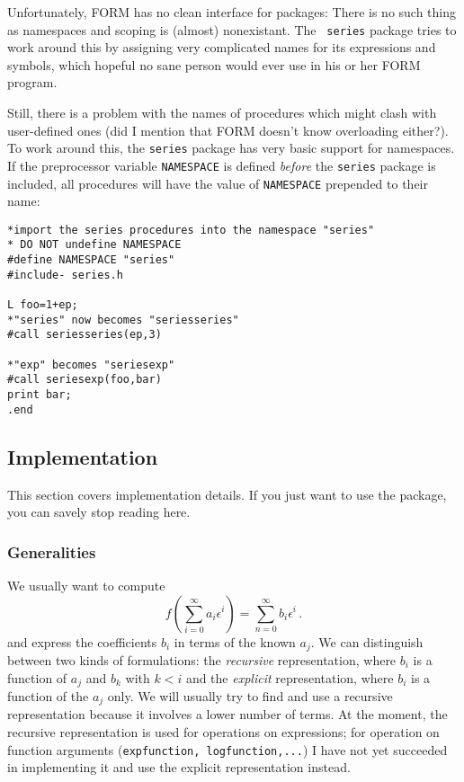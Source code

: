 \documentclass{article}
\begin{document}
Unfortunately, FORM has no clean interface for packages: There is no
such thing as namespaces and scoping is (almost) nonexistant. The {\tt
  series} package tries to work around this by assigning very complicated
names for its expressions and symbols, which hopeful no sane person
would ever use in his or her FORM program.

Still, there is a problem with the names of procedures which might clash
with user-defined ones (did I mention that FORM doesn't know overloading
either?). To work around this, the {\tt series} package has very basic
support for namespaces. If the preprocessor variable {\tt NAMESPACE} is
defined {\em before} the {\tt series} package is included, all
procedures will have the value of {\tt NAMESPACE} prepended to their name:
\begin{verbatim}
*import the series procedures into the namespace "series"
* DO NOT undefine NAMESPACE
#define NAMESPACE "series"
#include- series.h

L foo=1+ep;
*"series" now becomes "seriesseries"
#call seriesseries(ep,3)

*"exp" becomes "seriesexp"
#call seriesexp(foo,bar)
print bar;
.end
\end{verbatim}

\subsection{Implementation}
\label{sec:impl}

This section covers implementation details. If you just want to use the
package, you can savely stop reading here.

\subsubsection{Generalities}
\label{sec:impl_general}


 We usually want to compute
\begin{equation}
  \label{eq:def}
  f\left(\sum_{i=0}^{\infty}a_i \epsilon^i\right)=\sum_{n=0}^\infty b_i \epsilon^i\,.
\end{equation}
and express the coefficients $b_i$ in terms of the known $a_j$. We can
distinguish between two kinds of formulations: the {\it recursive} representation,
where $b_i$ is a function of $a_j$ and $b_k$ with $k < i$ and the {\it
  explicit} representation, where $b_i$ is a function of the $a_j$ only.
We will usually try to find and use a recursive representation because
it involves a lower number of terms. At the moment, the recursive
representation is used for operations on expressions; for operation
on function arguments ({\tt expfunction, logfunction,...}) I have not yet succeeded in
implementing it and use the explicit representation instead.
\end{document}
